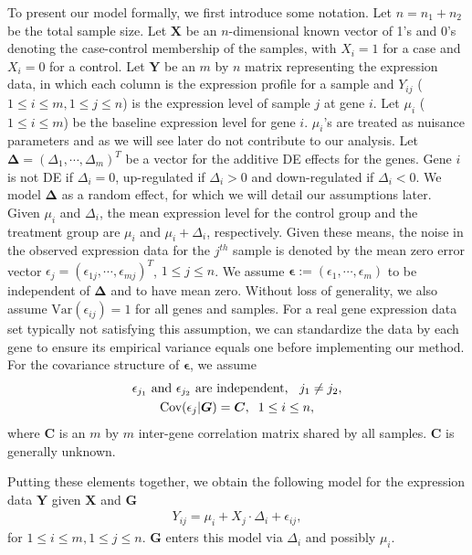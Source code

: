 \documentclass[a4,center,fleqn]{NAR}
\begin{document}
	To present our model formally, we first introduce some notation. Let $n=n_1+n_2$ be the total
	sample size. Let $\bm X$ be an $n$-dimensional known vector of 1's and 0's denoting the case-control
	membership of the samples, with $X_i=1$ for a case and $X_i=0$ for a control. Let $\bm Y$ be an $m$
	by $n$ matrix representing the expression data, in which each column is the expression profile for a
	sample and $Y_{ij}$ ($1\le i\le m, 1\le j\le n$) is the expression level of sample $j$ at gene
	$i$. Let $\mu_i$ ($1\le i\le m$) be the baseline expression level for gene $i$. $\mu_i$'s are
	treated as nuisance parameters and as we will see later do not contribute to our analysis. Let $\bm
	\Delta=(\Delta_1, \cdots, \Delta_m)^T$ be a vector for the additive DE effects for the genes. Gene
	$i$ is not DE if $\Delta_i=0$, up-regulated if $\Delta_i >0 $ and down-regulated if $\Delta_i<0$. We
	model $\bm \Delta$ as a random effect, for which we will detail our assumptions later. Given $\mu_i$
	and $\Delta_i$, the mean expression level for the control group and the treatment group are
	$\mu_i$ and $\mu_i+\Delta_i$, respectively. Given these means, the noise in the observed expression
	data for the $j^{th}$ sample is denoted by the mean zero error vector
	$\epsilon_j=(\epsilon_{1j},\cdots,\epsilon_{mj})^T$, $1\le j\le n$. We assume
	$\bm\epsilon:=(\epsilon_1,\cdots,\epsilon_m)$ to be independent of $\bm \Delta$ and to have mean
	zero. Without loss of generality, we also assume $\mbox{Var}(\epsilon_{ij})=1$ for all genes and
	samples. For a real gene expression data set typically not satisfying this assumption, we can
	standardize the data by each gene to ensure its empirical variance equals one before implementing
	our method. For the covariance structure of $\bm \epsilon$, we assume 
	\begin{gather}
	\text{$\epsilon_{j_1}$ and $\epsilon_{j_2}$ are independent, \;\;$j_1\ne
		j_2$},\label{eq:gene_indep}\\
	\mbox{Cov}(\epsilon_j|\bm G)=\bm C, \;\;1\le i\le n,\label{eq:gene_cor}
	\end{gather}
	where $\bm C$ is an $m$ by $m$ inter-gene correlation matrix shared by all samples. $\bm C$ is
	generally unknown.
	
	Putting these elements together, we obtain the following model for the expression data $\bm Y$
	given $\bm X$ and $\bm G$ 
	\begin{align}
	\label{eq:Ymodel}
	Y_{ij} = \mu_i + X_j\cdot\Delta_i + \epsilon_{ij},
	\end{align}
	for $1\le i\le m, 1\le j\le n$. $\bm G$ enters this model via $\Delta_i$ and possibly $\mu_i$.
	
\end{document}

